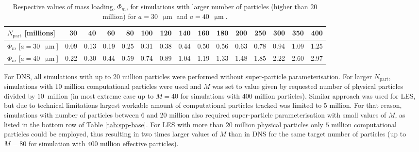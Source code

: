 \documentclass{pracamgren}
\begin{document}
\begin{table}[h]
\centering
\scriptsize
\begin{tabular}{lrrrrrrrrrrrrrr}
$N_{\text{part}}$ [millions] & 30 & 40 & 60 & 80 & 100 & 120 & 140 & 160 & 180 & 200 & 250 & 300 & 350 & 400 \\ \hline
$\Phi_m$ [$a = 30$~$\upmu\text{m}$] & 0.09 & 0.13 & 0.19 & 0.25 & 0.31 & 0.38 & 0.44 & 0.50 & 0.56 & 0.63 & 0.78 & 0.94 & 1.09 & 1.25 \\
$\Phi_m$ [$a = 40$~$\upmu\text{m}$] & 0.22 & 0.30 & 0.44 & 0.59 & 0.74 & 0.89 & 1.04 & 1.19 & 1.33 & 1.48 & 1.85 & 2.22 & 2.60 & 2.97 \\
\end{tabular}
\caption{Respective values of mass loading, $\Phi_m$, for simulations with larger number of particles (higher than $20$ million) for ${a = 30}$~$\upmu\text{m}$ and ${a = 40}$~$\upmu\text{m}$.
}
\label{tab:spp-ext}
\end{table}


For DNS, all simulations with up to $20$ million particles were performed without super-particle parameterisation.
For larger $N_{\text{part}}$, simulations with $10$ million computational particles were used and $M$ was set to value given by requested number of physical particles divided by $10$~million (in most extreme case up to $M = 40$ for simulations with $400$ million particles).
Similar approach was used for LES, but due to technical limitations largest workable amount of computational particles tracked was limited to $5$ million.
For that reason, simulations with number of particles between 6 and 20 million also required super-particle parameterisation with small values of $M$, as listed in the bottom row of Table \ref{tab:spp-base}.
For LES with more than $20$ million physical particles only $5$ million computational particles could be employed, thus resulting in two times larger values of $M$ than in DNS for the same target number of particles (up to $M=80$ for simulation with $400$ million effective particles).


\printbibliography[title=References]
\end{document}
